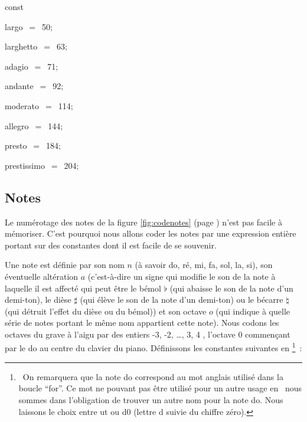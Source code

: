 {
\parindent {}
\medskip

\pagebreak[3] 
\vspace{\neglskip}\mbox{\blc  \idt  \mcl const\idt }\par 
\vspace{\neglskip}\mbox{\blc  \blk\blk\idt  largo\ $=$\ 50$;$}\par 
\vspace{\neglskip}\mbox{\blc  \blk\blk\idt  larghetto\ $=$\ 63$;$}\par 
\vspace{\neglskip}\mbox{\blc  \blk\blk\idt  adagio\ $=$\ 71$;$}\par 
\vspace{\neglskip}\mbox{\blc  \blk\blk\idt  andante\ $=$\ 92$;$}\par 
\vspace{\neglskip}\mbox{\blc  \blk\blk\idt  moderato\ $=$\ 114$;$}\par 
\vspace{\neglskip}\mbox{\blc  \blk\blk\idt  allegro\ $=$\ 144$;$}\par 
\vspace{\neglskip}\mbox{\blc  \blk\blk\idt  presto\ $=$\ 184$;$}\par 
\vspace{\neglskip}\mbox{\blc  \blk\blk\idt  prestissimo\ $=$\ 204$;$}\par 

\medskip }

\subsection{Notes}

\noindent Le numérotage des notes de la figure \ref{fig:codenotes} (page \pageref{fig:codenotes}) n'est
pas facile à mé\-mo\-ri\-ser. C'est pourquoi nous allons coder les notes par 
une expression entière portant sur des constantes dont il est facile de se souvenir.

Une note est définie par son nom $n$ (à savoir do, ré, mi, fa, sol, la, si), son éventuelle
altération $a$ (c'est-à-dire un signe qui modifie le son de la note à laquelle il est affecté
qui peut être le bémol $\flat$ (qui abaisse le son de la note d'un demi-ton),  
le dièse $\sharp$ (qui élève le son de la note d'un demi-ton) ou
le bécarre $\natural$ (qui détruit l'effet du dièse ou du bémol)) et
son octave $o$ (qui indique à quelle série de notes portant le même nom appartient cette note). 
Nous codons les octaves du grave à l'aigu par des entiers -3, -2, \ldots, 3, 4 , 
l'octave 0 commençant par le do au centre du clavier du piano. Définissons les
constantes suivantes en \pascal\footnote{\ On remarquera que la note {\mcl do} correspond au mot 
anglais utilisé dans la boucle ``for''.
Ce mot ne pouvant pas être utilisé pour un autre usage en \pascal\ nous sommes dans l'obligation
de trouver un autre nom pour la note do. Nous laissons le choix entre {\idt ut} ou {\idt d0} (lettre d
suivie du chiffre zéro).}~:

